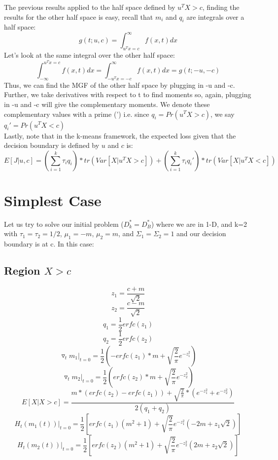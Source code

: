 \documentclass{article}
\begin{document}
The previous results applied to the half space defined by $u^TX > c$, finding the results for the other half space is easy, recall that $m_i$ and $q_i$ are integrals over a half space: 
\begin{equation}
g(t;u,c) = \int_{u^Tx=c}^\infty f(x,t)dx
\end{equation}
Let's look at the same integral over the other half space:
\begin{equation}
 \int_{-\infty}^{u^Tx=c} f(x,t)dx =  \int_{-u^Tx=-c}^\infty f(x,t)dx=g(t;-u,-c)
\end{equation}
\quad Thus, we can find the MGF of the other half space by plugging in -u and -c. Further, we take derivatives with respect to t to find moments so, again, plugging in -u and -c will give the complementary moments. We denote these complementary values with a prime (') i.e. since $q_i=Pr(u^TX>c)$, we say $q_i'=Pr(u^TX<c)$\\

\quad Lastly, note that in the k-means framework, the expected loss given that the decision boundary is defined by $u$ and $c$ is:
\begin{equation}
E[J|u,c] = (\sum\limits_{i=1}^k \tau_i q_i)*tr(Var[X|u^TX>c]) + (\sum\limits_{i=1}^k \tau_i q_i')*tr(Var[X|u^TX<c])
\end{equation}

\section{Simplest Case}
Let us try to solve our initial problem ($D_k^* = D_B^*$) where we are in 1-D, and k=2 with $\tau_1=\tau_2=1/2$, $\mu_1 = -m$, $\mu_2 = m$, and $\Sigma_1 = \Sigma_2 = 1$ and our decision boundary is at c. In this case:
\subsection{Region $X > c$} 
\[ z_1 = \frac{c+m}{\sqrt{2}} \]
\[ z_2 = \frac{c-m}{\sqrt{2}} \]
\[ q_1 = \frac{1}{2} erfc(z_1)\]
\[ q_2 = \frac{1}{2} erfc(z_2)\]
\[ \triangledown_t m_1|_{t=0} = \frac{1}{2}(-erfc(z_1)*m +\sqrt{\frac{2}{\pi}} e^{-z_1^2}) \]
\[ \triangledown_t m_2|_{t=0} = \frac{1}{2}(erfc(z_2)*m +\sqrt{\frac{2}{\pi}} e^{-z_2^2}) \]
\[ E[X|X>c]= \frac{m*(erfc(z_2) - erfc(z_1)) + \sqrt{\frac{2}{\pi}}*(e^{-z_1^2}+e^{-z_2^2})}{2(q_1+q_2)}\] 
\[ H_t(m_1(t))|_{t=0} = \frac{1}{2}[erfc(z_1)(m^2+1)+\sqrt{\frac{2}{\pi}}e^{-z_1^2}(-2m+z_1 \sqrt{2})]\]
\[ H_t(m_2(t))|_{t=0} = \frac{1}{2}[erfc(z_2)(m^2+1)+\sqrt{\frac{2}{\pi}}e^{-z_2^2}(2m+z_2 \sqrt{2})]\]
\end{document}
